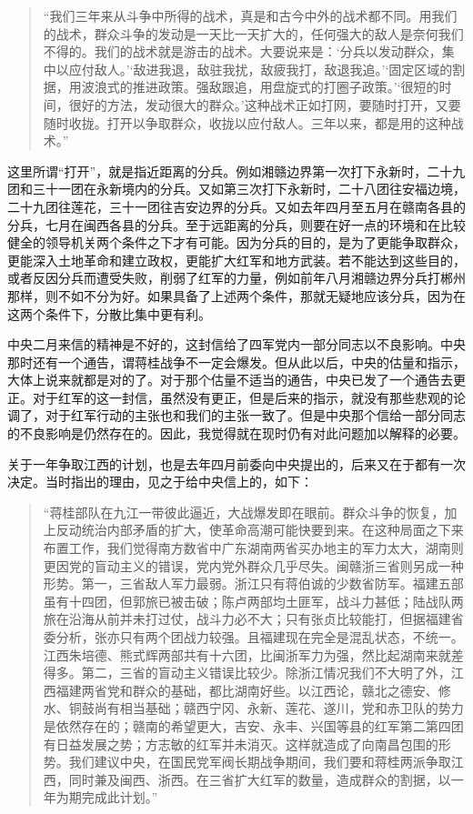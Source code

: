\begin{quote}
“我们三年来从斗争中所得的战术，真是和古今中外的战术都不同。用我们的战术，群众斗争的发动是一天比一天扩大的，任何强大的敌人是奈何我们不得的。我们的战术就是游击的战术。大要说来是：‘分兵以发动群众，集中以应付敌人。’‘敌进我退，敌驻我扰，敌疲我打，敌退我追。’‘固定区域的割据，用波浪式的推进政策。强敌跟追，用盘旋式的打圈子政策。’‘很短的时间，很好的方法，发动很大的群众。’这种战术正如打网，要随时打开，又要随时收拢。打开以争取群众，收拢以应付敌人。三年以来，都是用的这种战术。”
\end{quote}

这里所谓“打开”，就是指近距离的分兵。例如湘赣边界第一次打下永新时，二十九团和三十一团在永新境内的分兵。又如第三次打下永新时，二十八团往安福边境，二十九团往莲花，三十一团往吉安边界的分兵。又如去年四月至五月在赣南各县的分兵，七月在闽西各县的分兵。至于远距离的分兵，则要在好一点的环境和在比较健全的领导机关两个条件之下才有可能。因为分兵的目的，是为了更能争取群众，更能深入土地革命和建立政权，更能扩大红军和地方武装。若不能达到这些目的，或者反因分兵而遭受失败，削弱了红军的力量，例如前年八月湘赣边界分兵打郴州那样，则不如不分为好。如果具备了上述两个条件，那就无疑地应该分兵，因为在这两个条件下，分散比集中更有利。

中央二月来信的精神是不好的，这封信给了四军党内一部分同志以不良影响。中央那时还有一个通告，谓蒋桂战争不一定会爆发。但从此以后，中央的估量和指示，大体上说来就都是对的了。对于那个估量不适当的通告，中央已发了一个通告去更正。对于红军的这一封信，虽然没有更正，但是后来的指示，就没有那些悲观的论调了，对于红军行动的主张也和我们的主张一致了。但是中央那个信给一部分同志的不良影响是仍然存在的。因此，我觉得就在现时仍有对此问题加以解释的必要。

关于一年争取江西的计划，也是去年四月前委向中央提出的，后来又在于都有一次决定。当时指出的理由，见之于给中央信上的，如下：

\begin{quote}
“蒋桂部队在九江一带彼此逼近，大战爆发即在眼前。群众斗争的恢复，加上反动统治内部矛盾的扩大，使革命高潮可能快要到来。在这种局面之下来布置工作，我们觉得南方数省中广东湖南两省买办地主的军力太大，湖南则更因党的盲动主义的错误，党内党外群众几乎尽失。闽赣浙三省则另成一种形势。第一，三省敌人军力最弱。浙江只有蒋伯诚的少数省防军。福建五部虽有十四团，但郭旅已被击破；陈卢两部均土匪军，战斗力甚低；陆战队两旅在沿海从前并未打过仗，战斗力必不大；只有张贞比较能打，但据福建省委分析，张亦只有两个团战力较强。且福建现在完全是混乱状态，不统一。江西朱培德、熊式辉两部共有十六团，比闽浙军力为强，然比起湖南来就差得多。第二，三省的盲动主义错误比较少。除浙江情况我们不大明了外，江西福建两省党和群众的基础，都比湖南好些。以江西论，赣北之德安、修水、铜鼓尚有相当基础；赣西宁冈、永新、莲花、遂川，党和赤卫队的势力是依然存在的；赣南的希望更大，吉安、永丰、兴国等县的红军第二第四团有日益发展之势；方志敏的红军并未消灭。这样就造成了向南昌包围的形势。我们建议中央，在国民党军阀长期战争期间，我们要和蒋桂两派争取江西，同时兼及闽西、浙西。在三省扩大红军的数量，造成群众的割据，以一年为期完成此计划。”
\end{quote}

